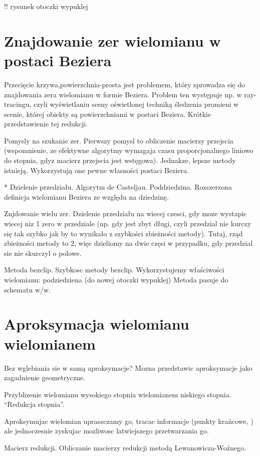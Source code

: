 \documentclass[11pt,a4paper,oneside]{report}
\begin{document}
!! rysunek otoczki wypuklej

\section{Znajdowanie zer wielomianu w postaci Beziera}

Przecięcie {krzywa,powierzchnia}-prosta jest problemem, który sprowadza się do znajdowania zera wielomianu w formie Beziera. Problem ten występuje np. w ray-tracingu, czyli wyświetlaniu sceny oświetlonej techniką śledzenia promieni w scenie, której obiekty są powierzchniami w postaci Beziera. Krótkie przedstawienie tej redukcji.

Pomysly na szukanie zer. Pierwszy pomysl to obliczenie macierzy przejscia (wspomnienie, ze efektywne algorytmy wymagaja czasu proporcjonalnego liniowo do stopnia, gdyz macierz przejscia jest wstęgowa). Jednakze, lepsze metody istnieją. Wykorzystują one pewne własności postaci Beziera.

* Dzielenie przedziału. Algorytm de Casteljau. Poddziedzina. Rozszerzona definicja wielomianu Beziera ze względu na dziedzinę.

Znjdowanie wielu zer. Dzielenie przedziału na wiecej czesci, gdy moze wystapic wiecej niz 1 zero w przedziale (np. gdy jest zbyt długi, czyli przedzial nie kurczy się tak szybko jak by to wynikało z szybkości zbieżności metody). Tutaj, rząd zbieżności metody to 2, więc dzieliomy na dwie częsi w przypadku, gdy przedzial sie nie skurczyl o polowe.

Metoda bezclip. Szybkosc metody bezclip.
Wykorzystujemy właściwości wielomianu: podziedziena (do nowej otoczki wypuklej)
Metoda pasuje do schematu w/w.

\section{Aproksymacja wielomianu wielomianem}

Bez wglebiania sie w samą aproksymacje? Mozna przedstawic aproksymacje jako zagadnienie geometryczne.

Przyblizenie wielomianu wysokiego stopnia wielomianem niskiego stopnia. ``Redukcja stopnia''. 

Aproksymujac wielomian upraszczamy go, tracac informacje (punkty krańcowe, ) ale jednoczesnie zyskujac mozliwosc latwiejszego przetwarzania go.

Macierz redukcji. Obliczanie macierzy redukcji metodą Lewanowicza-Woźnego.
\end{document}
